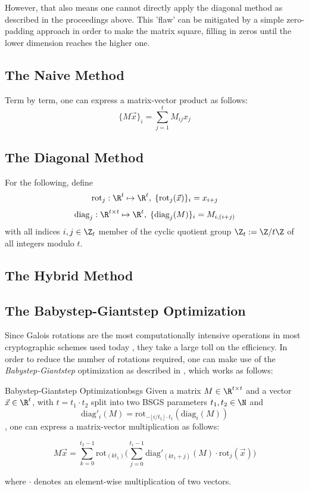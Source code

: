 However, that also means one cannot directly apply the diagonal method
as described in the proceedings above.
This 'flaw' can be mitigated by a simple zero-padding approach
in order to make the matrix square, filling in zeros until
the lower dimension reaches the higher one.

\subsection{The Naive Method}
Term by term, one can express a matrix-vector product as follows:
$$\{M \vec{x}\}_i = \sum_{j=1}^{t} M_{ij} x_j$$

\subsection{The Diagonal Method}
For the following, define
\newcommand{\rot}{\mathrm{rot}}
\newcommand{\diag}{\mathrm{diag}}
$$\rot_j: \R^t \mapsto \R^t, \; \{\rot_j(\vec{x})\}_i = x_{i + j}$$
$$\diag_j: \R^{t \times t} \mapsto \R^t, \; \{\diag_j(M)\}_i = M_{i, (i+j)}$$
with all indices $i, j \in \Z_t$ member of the cyclic quotient group $\Z_t := \Z / t \Z$ of all integers
modulo $t$.

\subsection{The Hybrid Method}
\subsection{The Babystep-Giantstep Optimization}
Since Galois rotations are the most computationally intensive operations in most cryptographic schemes used
today \parencite{2021-pasta}, they take a large toll on the efficiency.
In order to reduce the number of rotations required, one can make use of the \textit{Babystep-Giantstep}
optimization as described in \cite{2018-faster-helib}, which works as follows:

\begin{theorem}{Babystep-Giantstep Optimization}{bsgs}
  Given a matrix $M \in \R^{t \times t}$ and a vector $\vec{x} \in \R^t$,
  with $t = t_1 \cdot t_2$ split into two BSGS parameters $t_1, t_2 \in \N$ and
  $$\diag'_i(M) = \rot_{-\lfloor i/t_1 \rfloor \cdot t_1}(\diag_i(M))$$,
  one can express a matrix-vector multiplication as follows:

  \begin{equation}
    M \vec{x} = \sum_{k=0}^{t_2-1} \rot_{(kt_1)} \bigg(
    \sum_{j=0}^{t_1-1} \diag'_{(kt_1+j)}(M) \cdot \rot_j(\vec{x})
    \bigg)
  \end{equation}

  where $\cdot$ denotes an element-wise multiplication of two vectors.
\end{theorem}


